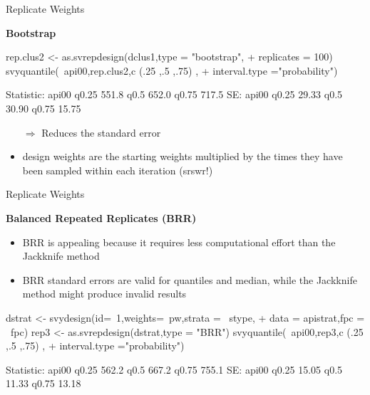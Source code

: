 \documentclass[11pt,german,hideothersubsections]{beamer}
\begin{document}
\begin{frame}[fragile]{Replicate Weights}
\footnotesize{
\begin{center}
\textbf{Bootstrap}
\end{center}
\begin{Schunk}
\begin{Sinput}
 rep.clus2 <- as.svrepdesign(dclus1,type = "bootstrap",
+                             replicates = 100)
 svyquantile(~api00,rep.clus2,c (.25 ,.5 ,.75) ,
+             interval.type ="probability")
\end{Sinput}
\begin{Soutput}
Statistic:
      api00
q0.25 551.8
q0.5  652.0
q0.75 717.5
SE:
      api00
q0.25 29.33
q0.5  30.90
q0.75 15.75
\end{Soutput}
\end{Schunk}
\begin{itemize}
\item[$\Rightarrow$] Reduces the standard error
\item design weights are the starting weights multiplied by the times they have been sampled within each iteration (srswr!)
\end{itemize}
}
\end{frame}
\begin{frame}[fragile]{Replicate Weights}
\footnotesize{
\begin{center}
\textbf{Balanced Repeated Replicates (BRR)}
\end{center}
\begin{itemize}
\item BRR is appealing because it requires less computational effort than the Jackknife method
\item BRR standard errors are valid for quantiles and median, while the Jackknife method might produce invalid results
\end{itemize}

\scriptsize{
\begin{Schunk}
\begin{Sinput}
 dstrat <- svydesign(id=~1,weights=~pw,strata = ~stype,
+                     data = apistrat,fpc = ~fpc) 
 rep3 <- as.svrepdesign(dstrat,type = "BRR")
 svyquantile(~api00,rep3,c (.25 ,.5 ,.75) ,
+              interval.type ="probability")
\end{Sinput}
\begin{Soutput}
Statistic:
      api00
q0.25 562.2
q0.5  667.2
q0.75 755.1
SE:
      api00
q0.25 15.05
q0.5  11.33
q0.75 13.18
\end{Soutput}
\end{Schunk}
}

}
\end{frame}
\end{document}
